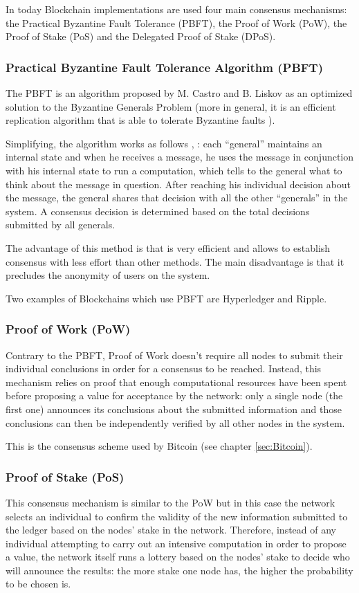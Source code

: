In today Blockchain implementations are used four main consensus mechanisms:
the Practical Byzantine Fault Tolerance (PBFT), the Proof of Work (PoW),
the Proof of Stake (PoS) and the Delegated Proof of Stake (DPoS).

\subsubsection{Practical Byzantine Fault Tolerance Algorithm (PBFT)} The PBFT is
an algorithm proposed by M. Castro and B. Liskov as an optimized solution to the
Byzantine Generals Problem (more in general, it is an efficient replication
algorithm that is able to tolerate Byzantine faults \cite{castro1999practical}).

Simplifying, the algorithm works as follows \cite{blockchain-consensus-medium},
\cite{castro1999practical}: each ``general'' maintains an internal state and
when he receives a message, he uses the message in conjunction with his internal
state to run a computation, which tells to the general what to think about the
message in question. After reaching his individual decision about the message,
the general shares that decision with all the other ``generals'' in the system.
A consensus decision is determined based on the total decisions submitted by all
generals.


The advantage of this method is that is very efficient and allows to establish
consensus with less effort than other methods. The main disadvantage is that it
precludes the anonymity of users on the system.

Two examples of Blockchains which use PBFT are Hyperledger and Ripple.

\subsubsection{Proof of Work (PoW)}
Contrary to the PBFT, Proof of Work doesn't require all nodes to submit their
individual conclusions in order for a consensus to be reached. Instead, this
mechanism relies on proof that enough computational resources have been spent
before proposing a value for acceptance by the network: only a single node (the first one)
announces its conclusions about the submitted information and those conclusions
can then be independently verified by all other nodes in the system.

This is the consensus scheme used by Bitcoin (see chapter \ref{sec:Bitcoin}).

\subsubsection{Proof of Stake (PoS)}\label{sec:proof-of-stake} This consensus
mechanism is similar to the PoW but in this case the network selects an
individual to confirm the validity of the new information submitted to the
ledger based on the nodes' stake in the network. Therefore, instead of any
individual attempting to carry out an intensive computation in order to propose
a value, the network itself runs a lottery based on the nodes' stake to decide
who will announce the results: the more stake one node has, the higher the
probability to be chosen is.

